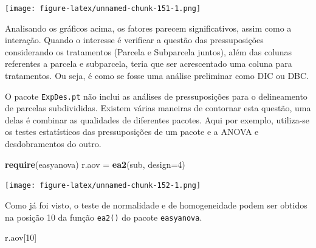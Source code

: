 \documentclass[
]{article}
\newenvironment{Shaded}{\begin{snugshade}}{\end{snugshade}}
\newcommand{\DataTypeTok}[1]{\textcolor[rgb]{0.13,0.29,0.53}{#1}}
\newcommand{\DecValTok}[1]{\textcolor[rgb]{0.00,0.00,0.81}{#1}}
\newcommand{\KeywordTok}[1]{\textcolor[rgb]{0.13,0.29,0.53}{\textbf{#1}}}
\newcommand{\NormalTok}[1]{#1}
\newcommand{\OperatorTok}[1]{\textcolor[rgb]{0.81,0.36,0.00}{\textbf{#1}}}
\newcommand{\StringTok}[1]{\textcolor[rgb]{0.31,0.60,0.02}{#1}}
\begin{document}
\begin{Shaded}
\end{Shaded}

\texttt{[image: figure-latex/unnamed-chunk-151-1.png]}

Analisando os gráficos acima, os fatores parecem significativos, assim como a interação. Quando o interesse é verificar a questão das pressuposições considerando os tratamentos (Parcela e Subparcela juntos), além das colunas referentes a parcela e subparcela, teria que ser acrescentado uma coluna para tratamentos. Ou seja, é como se fosse uma análise preliminar como DIC ou DBC.

O pacote \texttt{ExpDes.pt} não inclui as análises de pressuposições para o delineamento de parcelas subdivididas. Existem várias maneiras de contornar esta questão, uma delas é combinar as qualidades de diferentes pacotes. Aqui por exemplo, utiliza-se os testes estatísticos das pressuposições de um pacote e a ANOVA e desdobramentos do outro.

\begin{Shaded}
\begin{Highlighting}[]
\KeywordTok{require}\NormalTok{(easyanova)}
\NormalTok{r.aov =}\StringTok{ }\KeywordTok{ea2}\NormalTok{(sub, }\DataTypeTok{design=}\DecValTok{4}\NormalTok{)}
\end{Highlighting}
\end{Shaded}

\texttt{[image: figure-latex/unnamed-chunk-152-1.png]}

Como já foi visto, o teste de normalidade e de homogeneidade podem ser obtidos na posição 10 da função \texttt{ea2()} do pacote \texttt{easyanova}.

\begin{Shaded}
\begin{Highlighting}[]
\NormalTok{r.aov[}\DecValTok{10}\NormalTok{]}
\end{Highlighting}
\end{Shaded}
\end{document}
